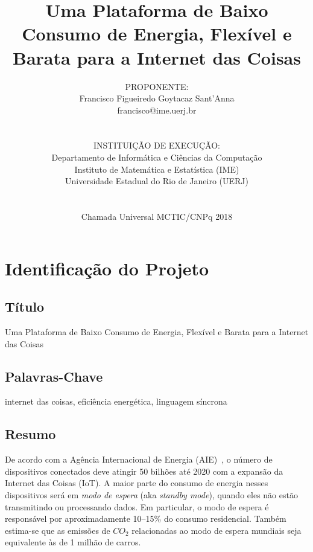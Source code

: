 \documentclass[titlepage,12pt]{article}
\title{ Uma Plataforma de Baixo Consumo de Energia, Flexível e Barata para a
        Internet das Coisas }
\author{PROPONENTE:                                     \\
Francisco Figueiredo Goytacaz Sant'Anna                 \\
francisco@ime.uerj.br                                   \\
\\\\
INSTITUIÇÃO DE EXECUÇÃO:                                \\
Departamento de Informática e Ciências da Computação    \\
Instituto de Matemática e Estatística (IME)             \\
Universidade Estadual do Rio de Janeiro (UERJ)          \\
\\\\
Chamada Universal MCTIC/CNPq 2018 
}
\begin{document}
 

\maketitle



\section{Identificação do Projeto}

\subsection{Título}

Uma Plataforma de Baixo Consumo de Energia, Flexível e Barata para a Internet
das Coisas


\subsection{Palavras-Chave}

internet das coisas, eficiência energética, linguagem síncrona


\subsection{Resumo}

De acordo com a Agência Internacional de Energia (AIE)~\cite{iea.data}, o
número de dispositivos conectados deve atingir 50 bilhões até 2020 com a
expansão da Internet das Coisas (IoT).
A maior parte do consumo de energia nesses dispositivos será em
\emph{modo de espera} (aka \emph{standby mode}), quando eles não estão
transmitindo ou processando dados.
Em particular, o modo de espera é responsável por aproximadamente 10--15\% do
consumo residencial.
Também estima-se que as emissões de $CO_2$ relacionadas ao modo de espera
mundiais seja equivalente às de 1 milhão de carros.
\end{document}
